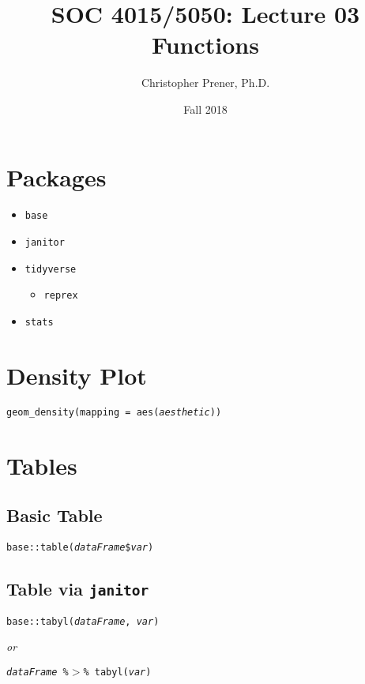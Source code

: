 \documentclass{tufte-handout}
\title{SOC 4015/5050: Lecture 03 Functions}
\author{Christopher Prener, Ph.D.}
\date{Fall 2018}
\newenvironment{subs}
  {\adjustwidth{3em}{0pt}}
  {\endadjustwidth}
\begin{document}
\maketitle %

\vspace{5mm}
\section{Packages}
\begin{itemize}
\item \texttt{base}
\item \texttt{janitor}
\item \texttt{tidyverse}
\begin{itemize}
\item \texttt{reprex}
\end{itemize}
\item \texttt{stats}
\end{itemize}

\vspace{5mm}
\section{Density Plot}
{\color{red}\texttt{geom\_density}}\texttt{(mapping = aes(\textit{aesthetic}))}


\vspace{5mm}
\section{Tables}
\begin{subs}
\subsection{Basic Table}
\texttt{base::}{\color{red}\texttt{table}}\texttt{(\textit{dataFrame}\$\textit{var})}

\vspace{3mm}
\subsection{Table via \texttt{janitor}}
\texttt{base::}{\color{red}\texttt{tabyl}}\texttt{(\textit{dataFrame}, \textit{var})}
\par \noindent \textit{or}
\par \noindent \texttt{\textit{dataFrame} \%$>$\% {\color{red}\texttt{tabyl}}\texttt{(\textit{var})}}
\end{subs}
\end{document}
